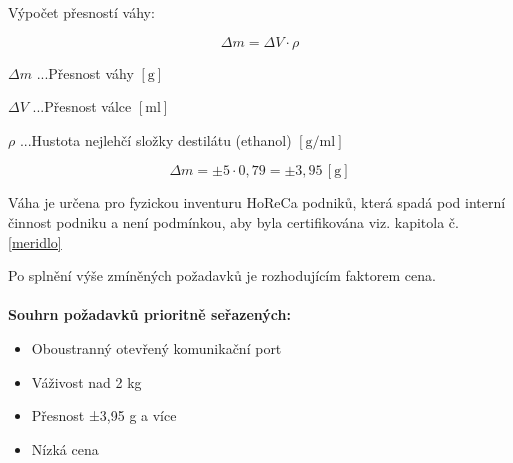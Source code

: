 Výpočet přesností váhy:


\begin{equation}
    \Delta m = \Delta V \cdot \rho \label{presnost vahy}
\end{equation}

\(\Delta m\) ...Přesnost váhy \([\mathrm{g}]\) %

\(\Delta V\) ...Přesnost válce \([\mathrm{ml}]\) %

\(\rho\) ...Hustota nejlehčí složky destilátu (ethanol) \([\mathrm{g/ml}]\)

\begin{equation}
    \Delta m = \pm5 \cdot 0,79 = \pm3,95 \, \left[\mathrm{g}\right] \label{presnost vahy}
\end{equation}



Váha je určena pro fyzickou inventuru HoReCa podniků, která spadá pod interní činnost podniku a není podmínkou, aby byla certifikována viz. kapitola č.\ref{meridlo}

Po splnění výše zmíněných požadavků je rozhodujícím faktorem cena.
\\ \\
\textbf{Souhrn požadavků prioritně seřazených:} %
\begin{itemize}
    \item Oboustranný otevřený komunikační port
    \item Váživost nad 2 kg
    \item Přesnost ±3,95 g a více
    \item Nízká cena
\end{itemize}

